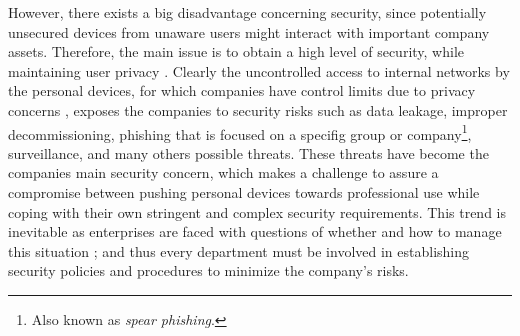 \documentclass[a4paper,10pt,twocolumn,preprint,3p]{elsarticle}
\begin{document}

However, there exists a big disadvantage concerning security, since
potentially unsecured devices from unaware users might interact with
important company assets. Therefore, the main issue is to obtain a high level
of security, while maintaining user privacy \cite{miller2012byod}.
Clearly the uncontrolled access to internal networks by the
personal devices, for which companies have control limits
due to privacy concerns \cite{miller2012byod}, exposes the companies to security risks such as data
leakage, improper decommissioning, phishing that is focused on a
specifig group or company\footnote{Also known as \textit{spear
    phishing}.}, 
surveillance, and many
others possible threats\cite{lennon2012changing}. These threats have become the
companies main security concern, which makes a challenge to
assure a compromise between pushing personal devices towards
professional use while coping with their own stringent and complex
security requirements. This trend is inevitable as enterprises are
faced with questions of whether and how to manage this situation \cite{thomson2012byod}; and
thus every department must be involved in establishing security
policies and procedures to minimize the company's risks.
\end{document}
